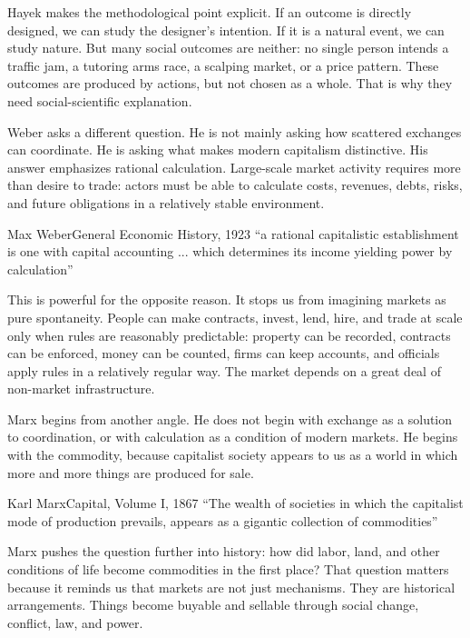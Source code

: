 \documentclass[10pt,a4paper]{article}
\begin{document}
Hayek makes the methodological point explicit. If an outcome is directly designed, we can study the designer's intention. If it is a natural event, we can study nature. But many social outcomes are neither: no single person intends a traffic jam, a tutoring arms race, a scalping market, or a price pattern. These outcomes are produced by actions, but not chosen as a whole. That is why they need social-scientific explanation.

Weber asks a different question. He is not mainly asking how scattered exchanges can coordinate. He is asking what makes modern capitalism distinctive. His answer emphasizes rational calculation. Large-scale market activity requires more than desire to trade: actors must be able to calculate costs, revenues, debts, risks, and future obligations in a relatively stable environment.

\begin{quotebox}{Max Weber}{General Economic History, 1923}
``a rational capitalistic establishment is one with capital accounting ... which determines its income yielding power by calculation''
\end{quotebox}

This is powerful for the opposite reason. It stops us from imagining markets as pure spontaneity. People can make contracts, invest, lend, hire, and trade at scale only when rules are reasonably predictable: property can be recorded, contracts can be enforced, money can be counted, firms can keep accounts, and officials apply rules in a relatively regular way. The market depends on a great deal of non-market infrastructure.

Marx begins from another angle. He does not begin with exchange as a solution to coordination, or with calculation as a condition of modern markets. He begins with the commodity, because capitalist society appears to us as a world in which more and more things are produced for sale.

\begin{quotebox}{Karl Marx}{Capital, Volume I, 1867}
``The wealth of societies in which the capitalist mode of production prevails, appears as a gigantic collection of commodities''
\end{quotebox}

Marx pushes the question further into history: how did labor, land, and other conditions of life become commodities in the first place? That question matters because it reminds us that markets are not just mechanisms. They are historical arrangements. Things become buyable and sellable through social change, conflict, law, and power.
\end{document}
